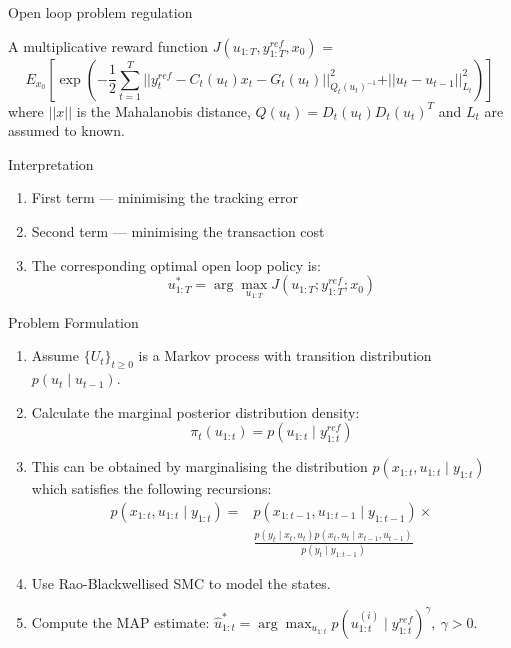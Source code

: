\documentclass[handout]{beamer}
\begin{document}
\begin{frame}{Open loop problem regulation}
\begin{block}{A multiplicative reward function}
\small
 $J(u_{1:T},y^{ref}_{1:T}, x_0)$ = 
\begin{equation*}
E_{x_0}\left[\exp\left( -\dfrac{1}{2}\displaystyle\sum^T_{t=1}\vert\vert y^{ref}_t - C_t(u_t)x_t - G_t(u_t) \vert\vert^2_{Q_t(u_t)^{-1}}  + \vert\vert u_t - u_{t-1} \vert\vert^2_{L_t} \right) \right]
\end{equation*}
where $\vert\vert x \vert\vert$ is the Mahalanobis distance, $Q(u_t) = D_t(u_t)D_t(u_t)^T$ and $L_t$ are assumed to known.
\end{block}
\begin{block}{Interpretation}
\begin{enumerate}
\item First term --- minimising the tracking error
\item Second term --- minimising the transaction cost
\item The corresponding optimal open loop policy is:
\begin{equation*}
  u^*_{1:T} = \arg\max_{u_{1:T}} J(u_{1:T};y^{ref}_{1:T};x_0)
\label{eq:optcontrol}
\end{equation*}
\end{enumerate}
\end{block}
\end{frame}

\begin{frame}{Problem Formulation}
\begin{enumerate}
\item Assume $\{U_t\}_{t \geq 0}$ is a Markov process with transition distribution $p(u_t \mid u_{t-1})$.
\item Calculate the marginal posterior distribution density:
\begin{equation*}
 \pi_t(u_{1:t}) = p(u_{1:t} \mid y^{ref}_{1:t})
\end{equation*} 
\item This can be obtained by marginalising the distribution $p(x_{1:t}, u_{1:t} \mid y_{1:t})$ which satisfies the following recursions:
\begin{align*}
  p(x_{1:t}, u_{1:t} \mid y_{1:t}) = &p(x_{1:t-1}, u_{1:t-1} \mid y_{1:t-1}) \times \\ &\frac{p(y_t \mid x_t, u_t)p(x_t, u_t \mid x_{t-1}, u_{t-1})}{p(y_t \mid y_{1:t-1})}
\end{align*}
\item Use Rao-Blackwellised SMC to model the states.
\item Compute the MAP estimate: $\hat{u}^*_{1:t} =  \arg\max_{u_{1:t}} p(u^{(i)}_{1:t} \mid y^{ref}_{1:t})^\gamma,~\gamma > 0$.
\end{enumerate}
\end{frame}
\end{document}

